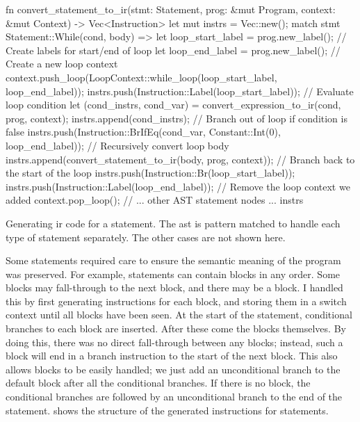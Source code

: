 \documentclass[00-main.tex]{subfiles}
\begin{document}
\begin{listing}[t]
  \begin{RustListing}
    fn convert_statement_to_ir(stmt: Statement, prog: &mut Program, context: &mut Context)
            -> Vec<Instruction> {
        let mut instrs = Vec::new();
        match stmt {
            Statement::While(cond, body) => {
                let loop_start_label = prog.new_label(); // Create labels for start/end of loop
                let loop_end_label = prog.new_label();
                // Create a new loop context
                context.push_loop(LoopContext::while_loop(loop_start_label, loop_end_label));
                instrs.push(Instruction::Label(loop_start_label));
                // Evaluate loop condition
                let (cond_instrs, cond_var) = convert_expression_to_ir(cond, prog, context);
                instrs.append(cond_instrs);
                // Branch out of loop if condition is false
                instrs.push(Instruction::BrIfEq(cond_var, Constant::Int(0), loop_end_label));
                // Recursively convert loop body
                instrs.append(convert_statement_to_ir(body, prog, context));
                // Branch back to the start of the loop
                instrs.push(Instruction::Br(loop_start_label));
                instrs.push(Instruction::Label(loop_end_label));
                // Remove the loop context we added
                context.pop_loop();
            }
            // ... other AST statement nodes ...
        }
        instrs
    }
  \end{RustListing}
  \caption{Generating \gls{ir} code for a  statement. The \gls{ast} is pattern matched to handle each type of statement separately. The other cases are not shown here.}
  \label{lst:convert while stmt to IR}
\end{listing}

Some statements required care to ensure the semantic meaning of the program was preserved.
For example,  statements can contain  blocks in any order.
Some blocks may fall-through to the next block, and there may be a  block.
I handled this by first generating instructions for each  block, and storing them in a switch context until all blocks have been seen.
At the start of the  statement, conditional branches to each  block are inserted.
After these come the blocks themselves.
By doing this, there was no direct fall-through between any blocks; instead, such a block will end in a branch instruction to the start of the next block.
This also allows  blocks to be easily handled; we just add an unconditional branch to the default block after all the conditional branches.
If there is no  block, the conditional branches are followed by an unconditional branch to the end of the  statement.
 shows the structure of the generated instructions for  statements.
\end{document}
